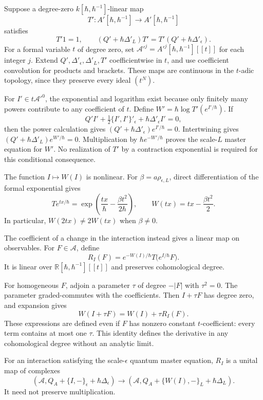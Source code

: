 Suppose a degree-zero $k[\hbar,\hbar^{-1}]$-linear map
\[
 T':A'[\hbar,\hbar^{-1}]\longrightarrow A'[\hbar,\hbar^{-1}]
\]
satisfies
\[
 T'1=1,\qquad
 (Q'+\hbar\Delta'_L)T'=T'(Q'+\hbar\Delta'_\epsilon).
\]
For a formal variable $t$ of degree zero, set
$\mathcal A'^j=A'^j[\hbar,\hbar^{-1}][[t]]$ for each integer $j$.
Extend $Q',\Delta'_\epsilon,\Delta'_L,T'$ coefficientwise in $t$,
and use coefficient convolution for products and brackets.
These maps are continuous in the $t$-adic topology, since they preserve
every ideal $(t^N)$.

For $I'\in t\mathcal A'^0$, the exponential and logarithm exist because
only finitely many powers contribute to any coefficient of $t$.
Define $W'=\hbar\log T'(e^{I'/\hbar})$.
If
\[
 Q'I'+\tfrac12\{I',I'\}'_\epsilon+\hbar\Delta'_\epsilon I'=0,
\]
then the power calculation gives
$(Q'+\hbar\Delta'_\epsilon)e^{I'/\hbar}=0$.
Intertwining gives $(Q'+\hbar\Delta'_L)e^{W'/\hbar}=0$.
Multiplication by $\hbar e^{-W'/\hbar}$ proves the scale-$L$ master
equation for $W'$.
No realization of $T'$ by a contraction exponential is required for this
conditional consequence.

The function $I\mapsto W(I)$ is nonlinear.
For $\beta=a\rho_{\epsilon,L}$, direct differentiation of the formal
exponential gives
\[
 T e^{t x/\hbar}
 =\exp\left(\frac{t x}{\hbar}-\frac{\beta t^2}{2\hbar}\right),
 \qquad W(tx)=tx-\frac{\beta t^2}{2}.
\]
In particular, $W(2tx)\ne2W(tx)$ when $\beta\ne0$.

The coefficient of a change in the interaction instead gives a linear
map on observables. For $F\in\mathcal A$, define
\begin{equation}\label{eq:gaussian-observable-map}
 R_I(F)=e^{-W(I)/\hbar}T\bigl(e^{I/\hbar}F\bigr).
\end{equation}
It is linear over $\mathbb R[\hbar,\hbar^{-1}][[t]]$ and preserves
cohomological degree.

For homogeneous $F$, adjoin a parameter $\tau$ of degree $-|F|$ with
$\tau^2=0$. The parameter graded-commutes with the coefficients.
Then $I+\tau F$ has degree zero, and expansion gives
\[
 W(I+\tau F)=W(I)+\tau R_I(F).
\]
These expressions are defined even if $F$ has nonzero constant
$t$-coefficient: every term contains at most one $\tau$.
This identity defines the derivative in any cohomological degree without
an analytic limit.

\begin{proposition}\label{prop:gaussian-observable-transport}
For an interaction satisfying the scale-$\epsilon$ quantum master
equation, $R_I$ is a unital map of complexes
\[
 (\mathcal A,Q_A+\{I,-\}_\epsilon+\hbar\Delta_\epsilon)
 \longrightarrow
 (\mathcal A,Q_A+\{W(I),-\}_L+\hbar\Delta_L).
\]
It need not preserve multiplication.
\end{proposition}

